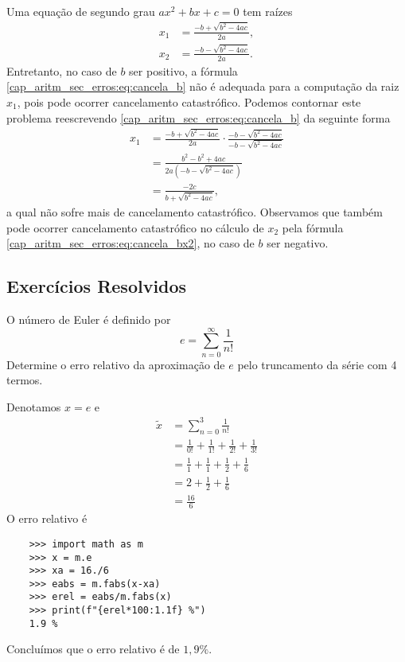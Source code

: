 \begin{ex}\label{ex:solpq}
  Uma equação de segundo grau $ax^2 + bx + c = 0$ tem raízes
  \begin{align}
    x_1 &= \frac{-b + \sqrt{b^2 - 4ac}}{2a},\label{cap_aritm_sec_erros:eq:cancela_b}\\
    x_2 &= \frac{-b - \sqrt{b^2 - 4ac}}{2a}.\label{cap_aritm_sec_erros:eq:cancela_bx2}
  \end{align}
Entretanto, no caso de $b$ ser positivo, a fórmula \eqref{cap_aritm_sec_erros:eq:cancela_b} não é adequada para a computação da raiz $x_1$, pois pode ocorrer cancelamento catastrófico. Podemos contornar este problema reescrevendo \eqref{cap_aritm_sec_erros:eq:cancela_b} da seguinte forma
\begin{align}
  x_1 &= \frac{-b + \sqrt{b^2 - 4ac}}{2a}\cdot \frac{-b - \sqrt{b^2 - 4ac}}{-b - \sqrt{b^2 - 4ac}}\\
  &= \frac{b^2 - b^2 + 4ac}{2a(-b-\sqrt{b^2-4ac})}\\
  &= \frac{-2c}{b+\sqrt{b^2-4ac}}\label{cap_aritm_sec_erros:eq:bx1m},
\end{align}
a qual não sofre mais de cancelamento catastrófico. Observamos que também pode ocorrer cancelamento catastrófico no cálculo de $x_2$ pela fórmula \eqref{cap_aritm_sec_erros:eq:cancela_bx2}, no caso de $b$ ser negativo.
\end{ex}

\subsection{Exercícios Resolvidos}

\begin{exeresol}
  O número de Euler é definido por
  \begin{equation}
    e = \sum_{n=0}^\infty \frac{1}{n!}
  \end{equation}
  Determine o erro relativo da aproximação de $e$ pelo truncamento da série com 4 termos.
\end{exeresol}
\begin{resol}
  Denotamos $x = e$ e
  \begin{align}
    \tilde{x} &= \sum_{n=0}^3\frac{1}{n!}\\
              &= \frac{1}{0!} + \frac{1}{1!} + \frac{1}{2!} + \frac{1}{3!}\\
              &= \frac{1}{1} + \frac{1}{1} + \frac{1}{2} + \frac{1}{6}\\
              &= 2 + \frac{1}{2} + \frac{1}{6}\\
              &= \frac{16}{6}
  \end{align}
  O erro relativo é
  \begin{lstlisting}
    >>> import math as m
    >>> x = m.e
    >>> xa = 16./6
    >>> eabs = m.fabs(x-xa)
    >>> erel = eabs/m.fabs(x)
    >>> print(f"{erel*100:1.1f} %")
    1.9 %
  \end{lstlisting}
  Concluímos que o erro relativo é de $1,9\%$.
\end{resol}

